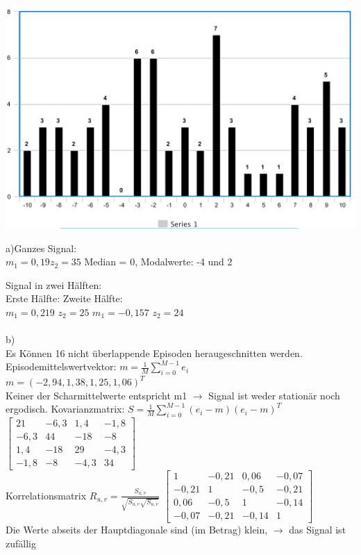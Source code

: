 \documentclass[fleqn,a4paper,12pt]{article}
\begin{document}
\includegraphics[scale=0.4]{H2}

a)Ganzes Signal:\\
$m_1 = 0,19		z_2 = 35$ \hspace{1cm}
Median = 0,	Modalwerte: -4 und 2

Signal in zwei H\"alften:\\
Erste H\"alfte:	\hspace{5cm}										Zweite H\"alfte:\\
$m_1 = 0,219$  $z_2 = 25$	\hspace{4cm}								$m_1 = -0,157$  $z_2 = 24$\\
\\
b)\\
Es K\"onnen 16 nicht \"uberlappende Episoden heraugeschnitten werden.
Episodemittelswertvektor: $m = \frac{1}{M}\sum_{i=0}^{M-1}e_i$\\
$m = (-2,94, 1,38, 1,25, 1,06)^T$\\
Keiner der Scharmittelwerte entspricht m1 $\rightarrow$ Signal ist weder station\"ar noch ergodisch.
\newpage
Kovarianzmatrix: $S = \frac{1}{M}\sum_{i=0}^{M-1}(e_i-m)(e_i-m)^T$\\
$
\begin{bmatrix}
21   & -6,3 & 1,4	 &  -1,8 \\
-6,3 & 44 	& -18	 &  -8 \\
1,4  & -18	& 29 	 & -4,3 \\
-1,8 & -8 	& -4,3	 &  34
\end{bmatrix}
$\\
Korrelationsmatrix $R_{u,v} = \frac{S_{u,v}}{\sqrt{S_{u,v} \sqrt{S_{u,v}}}}$
$
\begin{bmatrix}
1   & -0,21 & 0,06	 &  -0,07 \\
-0,21 & 1 	& -0,5	 &  -0,21 \\
0,06  & -0,5	& 1 	 & -0,14 \\
-0,07 & -0,21 	& -0,14	 &  1
\end{bmatrix}
$\\Die Werte abseits der Hauptdiagonale sind (im Betrag) klein, $\rightarrow$ das Signal ist zuf\"allig\\
\end{document}
